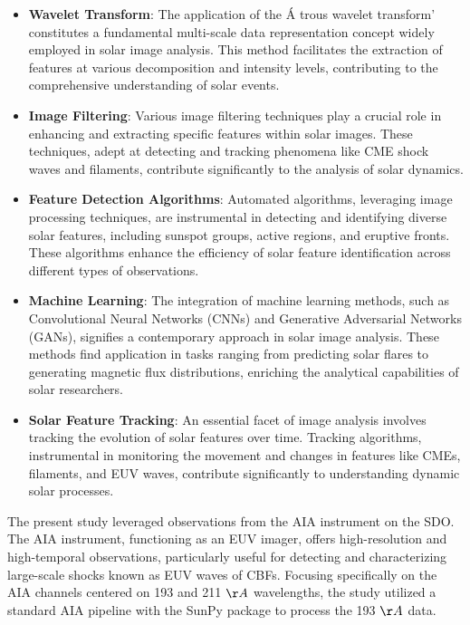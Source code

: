 \begin{itemize}
	\item \textbf{Wavelet Transform}:
	The application of the \'A trous wavelet transform' constitutes a fundamental multi-scale data representation concept widely employed in solar image analysis. This method facilitates the extraction of features at various decomposition and intensity levels, contributing to the comprehensive understanding of solar events.
	
	\item \textbf{Image Filtering}:
	Various image filtering techniques play a crucial role in enhancing and extracting specific features within solar images. These techniques, adept at detecting and tracking phenomena like CME shock waves and filaments, contribute significantly to the analysis of solar dynamics.
	
	\item \textbf{Feature Detection Algorithms}:
	Automated algorithms, leveraging image processing techniques, are instrumental in detecting and identifying diverse solar features, including sunspot groups, active regions, and eruptive fronts. These algorithms enhance the efficiency of solar feature identification across different types of observations.
	
	\item \textbf{Machine Learning}:
	The integration of machine learning methods, such as Convolutional Neural Networks (CNNs) and Generative Adversarial Networks (GANs), signifies a contemporary approach in solar image analysis. These methods find application in tasks ranging from predicting solar flares to generating magnetic flux distributions, enriching the analytical capabilities of solar researchers.
	
	\item \textbf{Solar Feature Tracking}:
	An essential facet of image analysis involves tracking the evolution of solar features over time. Tracking algorithms, instrumental in monitoring the movement and changes in features like CMEs, filaments, and EUV waves, contribute significantly to understanding dynamic solar processes.
\end{itemize}

The present study leveraged observations from the AIA instrument on the SDO. The AIA instrument, functioning as an EUV imager, offers high-resolution and high-temporal observations, particularly useful for detecting and characterizing large-scale shocks known as EUV waves of CBFs. Focusing specifically on the AIA channels centered on 193 and 211 $\AA$ wavelengths, the study utilized a standard AIA pipeline with the SunPy package to process the 193 $\AA$ data.

